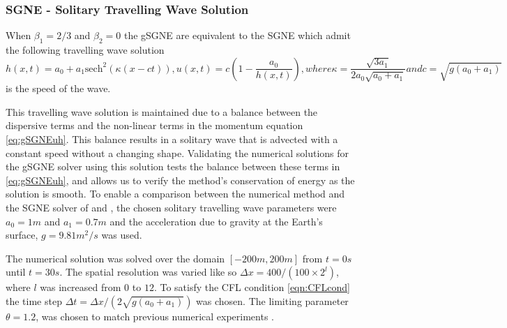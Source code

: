 \documentclass[10pt]{elsarticle}
\begin{document}
\subsubsection{SGNE - Solitary Travelling Wave Solution}
When $\beta_1 = 2/3$ and $\beta_2 = 0$ the gSGNE are equivalent to the SGNE which admit the following travelling wave solution \cite{El-etal-2006}
\begin{subequations}
	\begin{equation}
	h(x,t) = a_0 + a_1 \text{sech}^2\left( \kappa (x - ct) \right),
	\end{equation}
	\begin{equation}
	u(x,t) = c \left( 1- \dfrac{a_0}{h(x,t)} \right),
	\end{equation}
	where
	\begin{equation}
	\kappa = \dfrac{\sqrt{3a_1}}{2a_0 \sqrt{a_0 + a_1}}
	\end{equation}
	and
	\begin{equation}
	c = \sqrt{g\left(a_0 + a_1\right)}
	\label{eq:Sol_speed}
	\end{equation}
\end{subequations}
is the speed of the wave.

This travelling wave solution is maintained due to a balance between the dispersive terms and the non-linear terms in the momentum equation \eqref{eq:gSGNEuh}. This balance results in a solitary wave that is advected with a constant speed without a changing shape. Validating the numerical solutions for the gSGNE solver using this solution tests the balance between these terms in \eqref{eq:gSGNEuh}, and allows us to verify the method's conservation of energy as the solution is smooth. To enable a comparison between the numerical method and the SGNE solver of \citet{Zoppou-etal-2017} and \citet{Pitt-2019}, the chosen solitary travelling wave parameters were $a_0 = 1m$ and $a_1 = 0.7m$ and the acceleration due to gravity at the Earth's surface, $g = 9.81 m^2/s$ was used.

The numerical solution was solved over the domain $\left[-200m,200m\right]$ from $t=0s$ until $t=30s$. The spatial resolution was varied like so $\Delta x = 400 / (100 \times 2^{l})$, where $l$ was increased from $0$ to $12$. To satisfy the CFL condition \eqref{eqn:CFLcond} the time step $\Delta t = \Delta x  / ( 2 \sqrt{g(a_0 + a_1)})$ was chosen. The limiting parameter $\theta = 1.2$, was chosen to match previous numerical experiments \cite{Zoppou-etal-2017,Pitt-2019}.
\end{document}
